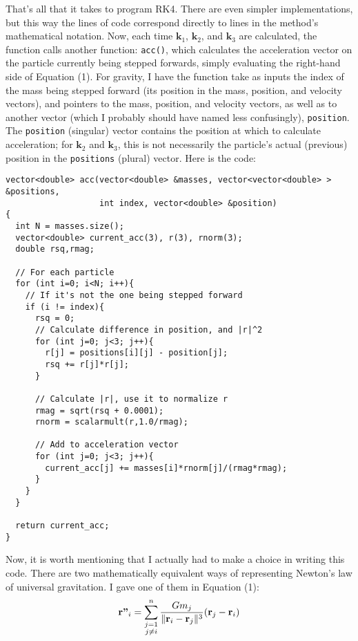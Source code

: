 \documentclass{article}
\DeclarePairedDelimiter{\norm}{\lVert}{\rVert}
\begin{document}
That's all that it takes to program RK4. There are even simpler implementations, but this way the lines of code correspond directly to lines in the method's mathematical notation. Now, each time $\textbf{k}_1$, $\textbf{k}_2$, and $\textbf{k}_3$ are calculated, the function calls another function: \colorbox{g}{\lstinline[basicstyle=\ttfamily\footnotesize\color{black}]|acc()|}, which calculates the acceleration vector on the particle currently being stepped forwards, simply evaluating the right-hand side of Equation (1). For gravity, I have the function take as inputs the index of the mass being stepped forward (its position in the mass, position, and velocity vectors), and pointers to the mass, position, and velocity vectors, as well as to another vector (which I probably should have named less confusingly), \colorbox{g}{\lstinline[basicstyle=\ttfamily\footnotesize\color{black}]|position|}. The \colorbox{g}{\lstinline[basicstyle=\ttfamily\footnotesize\color{black}]|position|} (singular) vector contains the position at which to calculate acceleration; for $\textbf{k}_2$ and $\textbf{k}_3$, this is not necessarily the particle's actual (previous) position in the \colorbox{g}{\lstinline[basicstyle=\ttfamily\footnotesize\color{black}]|positions|} (plural) vector. Here is the code:

\linespread{1}
\begin{lstlisting}[style=CStyle,firstnumber=1]
vector<double> acc(vector<double> &masses, vector<vector<double> > &positions, 
                   int index, vector<double> &position)
{
  int N = masses.size();
  vector<double> current_acc(3), r(3), rnorm(3);
  double rsq,rmag;

  // For each particle
  for (int i=0; i<N; i++){
    // If it's not the one being stepped forward
    if (i != index){
      rsq = 0;
      // Calculate difference in position, and |r|^2
      for (int j=0; j<3; j++){
        r[j] = positions[i][j] - position[j];
        rsq += r[j]*r[j];
      }   

      // Calculate |r|, use it to normalize r
      rmag = sqrt(rsq + 0.0001);
      rnorm = scalarmult(r,1.0/rmag);

      // Add to acceleration vector
      for (int j=0; j<3; j++){
        current_acc[j] += masses[i]*rnorm[j]/(rmag*rmag);
      }   
    }   
  }

  return current_acc;
}
\end{lstlisting}
\linespread{2}

Now, it is worth mentioning that I actually had to make a choice in writing this code. There are two mathematically equivalent ways of representing Newton's law of universal gravitation. I gave one of them in Equation (1):
\begin{equation*}
    \textbf{r''}_i = \sum_{\substack{j=1\\j\neq i}}^n \frac{Gm_j}{\norm{\textbf{r}_i-\textbf{r}_j}^3}(\textbf{r}_j-\textbf{r}_i)
\end{equation*}
\end{document}
